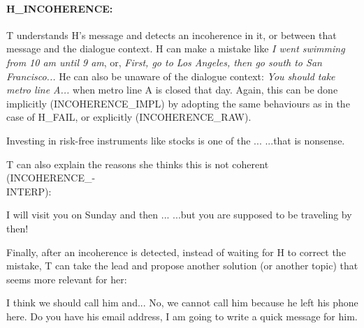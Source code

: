 				\paragraph{H\_INCOHERENCE:} T understands H's message and detects an incoherence in it, or between that message and the dialogue context. H can make a mistake like \textit{I went swimming from 10 am until 9 am}, or, \textit{First, go to Los Angeles, then go south to San Francisco...} He can also be unaware of the dialogue context: \textit{You should take metro line A...} when metro line A is closed that day. Again, this can be done implicitly (INCOHERENCE\_IMPL) by adopting the same behaviours as in the case of H\_FAIL, or explicitly (INCOHERENCE\_RAW).
					
						\begin{dialogue}
							 Investing in risk-free instruments like stocks is one of the ...
							 ...that is nonsense.
						\end{dialogue}
						
						T can also explain the reasons she thinks this is not coherent (INCOHERENCE\_-\\INTERP):
						
						\begin{dialogue}
							 I will visit you on Sunday and then ...
							 ...but you are supposed to be traveling by then!
						\end{dialogue}

                                                Finally, after an incoherence is detected, instead of waiting for H to correct the mistake, T can take the lead and propose another solution (or another topic) that seems more relevant for her:
                                                
                                                \begin{dialogue}
                                                   I think we should call him and...
                                                   No, we cannot call him because he left his phone here. Do you have his email address, I am going to write a quick message for him.
                                                \end{dialogue}
						
